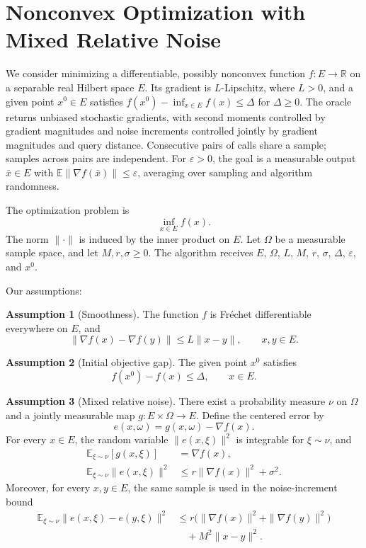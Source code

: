 \documentclass[10pt]{article}
\theoremstyle{definition}
\newtheorem{assumption}{Assumption}
\begin{document}
\section*{Nonconvex Optimization with Mixed Relative Noise}
We consider minimizing a differentiable, possibly nonconvex function $f:E\to\mathbb{R}$ on a separable real Hilbert space $E$. Its gradient is $L$-Lipschitz, where $L>0$, and a given point $x^0\in E$ satisfies $f(x^0)-\inf_{x\in E}f(x)\leq\Delta$ for $\Delta\geq0$. The oracle returns unbiased stochastic gradients, with second moments controlled by gradient magnitudes and noise increments controlled jointly by gradient magnitudes and query distance. Consecutive pairs of calls share a sample; samples across pairs are independent. For $\varepsilon>0$, the goal is a measurable output $\bar{x}\in E$ with $\mathbb{E}\|\nabla f(\bar{x})\|\leq\varepsilon$, averaging over sampling and algorithm randomness.

The optimization problem is
\[
\inf_{x\in E} f(x).
\]
The norm $\|\cdot\|$ is induced by the inner product on $E$. Let $\Omega$ be a measurable sample space, and let $M,r,\sigma\geq0$. The algorithm receives $E$, $\Omega$, $L$, $M$, $r$, $\sigma$, $\Delta$, $\varepsilon$, and $x^0$.

Our assumptions:
\begin{assumption}[Smoothness]
The function $f$ is Fr\'echet differentiable everywhere on $E$, and
\[
\|\nabla f(x)-\nabla f(y)\|\leq L\|x-y\|,
\qquad x,y\in E.
\]
\end{assumption}

\begin{assumption}[Initial objective gap]
The given point $x^0$ satisfies
\[
f(x^0)-f(x)\leq\Delta,
\qquad x\in E.
\]
\end{assumption}

\begin{assumption}[Mixed relative noise]
There exist a probability measure $\nu$ on $\Omega$ and a jointly measurable map $g:E\times\Omega\to E$. Define the centered error by
\[
e(x,\omega)=g(x,\omega)-\nabla f(x).
\]
For every $x\in E$, the random variable $\|e(x,\xi)\|^2$ is integrable for $\xi\sim\nu$, and
\[
\begin{aligned}
\mathbb{E}_{\xi\sim\nu}[g(x,\xi)]&=\nabla f(x),\\
\mathbb{E}_{\xi\sim\nu}\|e(x,\xi)\|^2
&\leq r\|\nabla f(x)\|^2+\sigma^2.
\end{aligned}
\]
Moreover, for every $x,y\in E$, the same sample is used in the noise-increment bound
\[
\begin{aligned}
\mathbb{E}_{\xi\sim\nu}\|e(x,\xi)-e(y,\xi)\|^2
&\leq r\bigl(\|\nabla f(x)\|^2+\|\nabla f(y)\|^2\bigr)\\
&\quad+M^2\|x-y\|^2.
\end{aligned}
\]
\end{assumption}
\end{document}
